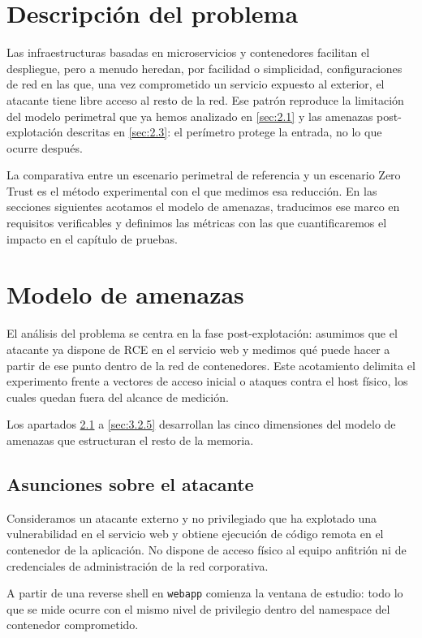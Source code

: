 \documentclass[11pt,spanish,listoffigures,listoftables]{tfgetsinf}
\begin{document}
    \section{Descripción del problema}
    Las infraestructuras basadas en microservicios y contenedores facilitan el despliegue, pero a menudo heredan, por facilidad o simplicidad, configuraciones de red en las que, una vez comprometido un servicio expuesto al exterior, el atacante tiene libre acceso al resto de la red. Ese patrón reproduce la limitación del modelo perimetral que ya hemos analizado en \cref{sec:2.1} y las amenazas post-explotación descritas en \cref{sec:2.3}: el perímetro protege la entrada, no lo que ocurre después.
    
    La comparativa entre un escenario perimetral de referencia y un escenario Zero Trust es el método experimental con el que medimos esa reducción. En las secciones siguientes acotamos el modelo de amenazas, traducimos ese marco en requisitos verificables y definimos las métricas con las que cuantificaremos el impacto en el capítulo de pruebas.
    
    
    \section{Modelo de amenazas}
    \label{sec:3.2}
    El análisis del problema se centra en la fase post-explotación: asumimos que el atacante ya dispone de RCE en el servicio web y medimos qué puede hacer a partir de ese punto dentro de la red de contenedores. Este acotamiento delimita el experimento frente a vectores de acceso inicial o ataques contra el host físico, los cuales quedan fuera del alcance de medición.

    Los apartados \cref{sec:3.2.1} a \cref{sec:3.2.5} desarrollan las cinco dimensiones del modelo de amenazas que estructuran el resto de la memoria.
    
        \subsection{Asunciones sobre el atacante}
        \label{sec:3.2.1}
        Consideramos un atacante externo y no privilegiado que ha explotado una vulnerabilidad en el servicio web y obtiene ejecución de código remota en el contenedor de la aplicación. No dispone de acceso físico al equipo anfitrión ni de credenciales de administración de la red corporativa. 

        A partir de una reverse shell en \texttt{webapp} comienza la ventana de estudio: todo lo que se mide ocurre con el mismo nivel de privilegio dentro del namespace del contenedor comprometido.
\end{document}
